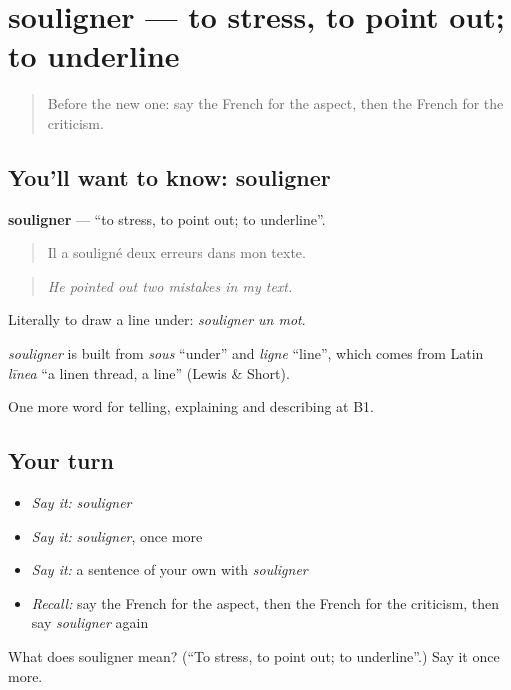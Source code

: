 \section[souligner]{souligner — to stress, to point out; to underline}

\label{lesson:FR-C343-souligner}



\begin{quote}
Before the new one: say the French for the aspect, then the French for the criticism.
\end{quote}

\subsection*{You'll want to know: souligner}
\textbf{souligner} — \textquotedblleft{}to stress, to point out; to underline\textquotedblright{}.

\begin{quote}
Il a souligné deux erreurs dans mon texte.
\end{quote}

\begin{quote}
\emph{He pointed out two mistakes in my text.}
\end{quote}

Literally to draw a line under: \emph{souligner un mot}.

\begin{cousinweb}
\emph{souligner} is built from \emph{sous} \textquotedblleft{}under\textquotedblright{} and \emph{ligne} \textquotedblleft{}line\textquotedblright{}, which comes from Latin \emph{līnea} \textquotedblleft{}a linen thread, a line\textquotedblright{} (Lewis \& Short).
\end{cousinweb}

\begin{grammarlens}[title={What you've built}]
One more word for telling, explaining and describing at B1.
\end{grammarlens}

\subsection*{Your turn}
\begin{itemize}
\raggedright
  \item \emph{Say it:} \emph{souligner}
  \item \emph{Say it:} \emph{souligner}, once more
  \item \emph{Say it:} a sentence of your own with \emph{souligner}
  \item \emph{Recall:} say the French for the aspect, then the French for the criticism, then say \emph{souligner} again
\end{itemize}

\begin{tcolorbox}[breakable,colback=teal!4,colframe=teal!35!black,title={Before you move on}]
What does souligner mean? (\textquotedblleft{}To stress, to point out; to underline\textquotedblright{}.) Say it once more.
\end{tcolorbox}
